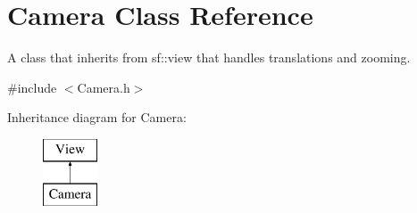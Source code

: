 \hypertarget{class_camera}{}\section{Camera Class Reference}
\label{class_camera}


A class that inherits from sf\+::view that handles translations and zooming.  




{\ttfamily \#include $<$Camera.\+h$>$}

Inheritance diagram for Camera\+:\begin{figure}[H]
\begin{center}
\leavevmode
\includegraphics[height=2.000000cm]{class_camera}
\end{center}
\end{figure}
